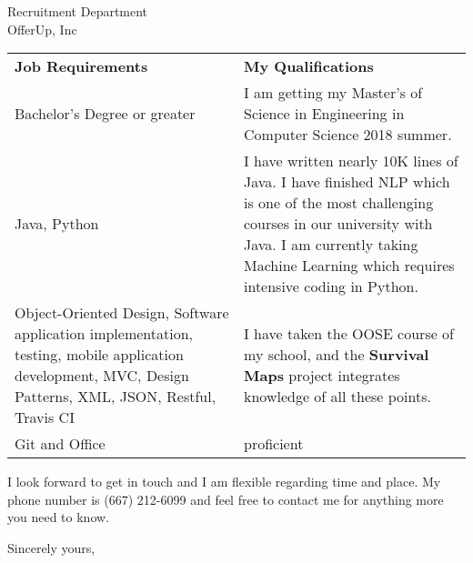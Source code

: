 \documentclass[11pt]{letter} %
\begin{document}
\begin{letter}{Recruitment Department \\
OfferUp, Inc}
\begin{tabular}{p{0.5\linewidth} p{0.5\linewidth}}
\textbf{Job Requirements} & \textbf{My Qualifications} \\
Bachelor's Degree or greater & I am getting my Master's of Science in Engineering in Computer Science 2018 summer. \\
Java, Python & I have written nearly 10K lines of Java. I have finished NLP which is one of the most challenging courses in our university with Java. I am currently taking Machine Learning which requires intensive coding in Python.\\
Object-Oriented Design, Software application implementation, testing, mobile application development, MVC, Design Patterns, XML, JSON, Restful, Travis CI & I have taken the OOSE course of my school, and the \textbf{Survival Maps} project integrates knowledge of all these points.\\
Git and Office & proficient\\
\end{tabular}

I look forward to get in touch and I am flexible regarding time and place. My phone number is (667) 212-6099 and feel free to contact me for anything more you need to know.

\closing{Sincerely yours,}




\end{letter}
\end{document}
